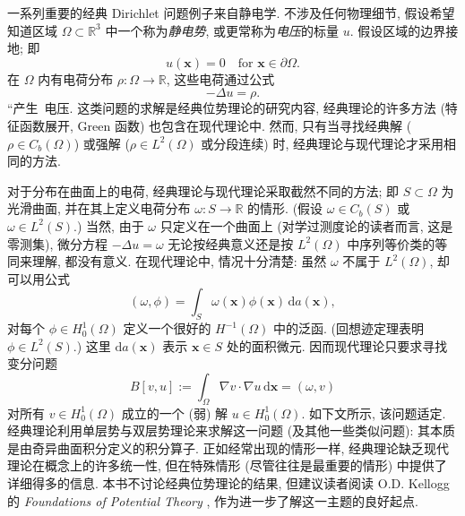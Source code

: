 \begin{Example}
\label{ex:electrostatic-surface-charge-weak-solution}
一系列重要的经典 Dirichlet 问题例子来自静电学. 不涉及任何物理细节, 假设希望知道区域 $\Omega\subset\mathbb{R}^3$ 中一个称为\emph{静电势}, 或更常称为\emph{电压}的标量 $u$. 假设区域的边界接地; 即
\begin{equation}\label{eq:electrostatic-grounded-dirichlet-boundary}
u(\bm{x})=0\quad\text{for }\bm{x}\in\partial\Omega.
\end{equation}
在 $\Omega$ 内有电荷分布 $\rho:\Omega\to\mathbb{R}$, 这些电荷通过公式
\begin{equation}\label{eq:electrostatic-charge-poisson-equation}
-\Delta u=\rho.
\end{equation}
``产生\textquotesingle\textquotesingle\ 电压. 这类问题的求解是经典位势理论的研究内容, 经典理论的许多方法 (特征函数展开, Green 函数) 也包含在现代理论中. 然而, 只有当寻找经典解 ($\rho\in C_b(\Omega)$) 或强解 ($\rho\in L^2(\Omega)$ 或分段连续) 时, 经典理论与现代理论才采用相同的方法.

对于分布在曲面上的电荷, 经典理论与现代理论采取截然不同的方法; 即 $S\subset\Omega$ 为光滑曲面, 并在其上定义电荷分布 $\omega:S\to\mathbb{R}$ 的情形. (假设 $\omega\in C_b(S)$ 或 $\omega\in L^2(S)$.) 当然, 由于 $\omega$ 只定义在一个曲面上 (对学过测度论的读者而言, 这是零测集), 微分方程 $-\Delta u=\omega$ 无论按经典意义还是按 $L^2(\Omega)$ 中序列等价类的等同来理解, 都没有意义. 在现代理论中, 情况十分清楚: 虽然 $\omega$ 不属于 $L^2(\Omega)$, 却可以用公式
\begin{equation}\label{eq:surface-charge-negative-sobolev-functional}
(\omega,\phi)=\int_S\omega(\bm{x})\phi(\bm{x})\,\mathrm{d}a(\bm{x}),
\end{equation}
对每个 $\phi\in H_0^1(\Omega)$ 定义一个很好的 $H^{-1}(\Omega)$ 中的泛函. (回想迹定理表明 $\phi\in L^2(S)$.) 这里 $\mathrm{d}a(\bm{x})$ 表示 $\bm{x}\in S$ 处的面积微元. 因而现代理论只要求寻找变分问题
\begin{equation}\label{eq:surface-charge-electrostatic-variational-problem}
B[v,u]:=\int_\Omega\nabla v\cdot\nabla u\,\mathrm{d}\bm{x}=(\omega,v)
\end{equation}
对所有 $v\in H_0^1(\Omega)$ 成立的一个 (弱) 解 $u\in H_0^1(\Omega)$. 如下文所示, 该问题适定. 经典理论利用单层势与双层势理论来求解这一问题 (及其他一些类似问题): 其本质是由奇异曲面积分定义的积分算子. 正如经常出现的情形一样, 经典理论缺乏现代理论在概念上的许多统一性, 但在特殊情形 (尽管往往是最重要的情形) 中提供了详细得多的信息. 本书不讨论经典位势理论的结果, 但建议读者阅读 O.D. Kellogg 的 \emph{Foundations of Potential Theory} \cite{Ke}, 作为进一步了解这一主题的良好起点.
\end{Example}
